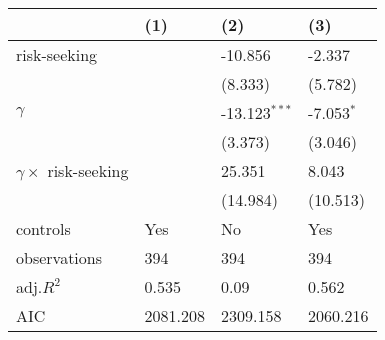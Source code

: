 \begin{tabular}{llll}
\hline
 & (1) & (2) & (3) \\
\hline
risk-seeking &  & -10.856 & -2.337 \\
 &  & (8.333) & (5.782) \\
$\gamma$ &  & -13.123$^{***}$ & -7.053$^{*}$ \\
 &  & (3.373) & (3.046) \\
$\gamma \times$ risk-seeking &  & 25.351 & 8.043 \\
 &  & (14.984) & (10.513) \\
controls & Yes & No & Yes \\
observations & 394 & 394 & 394 \\
adj.$R^2$ & 0.535 & 0.09 & 0.562 \\
AIC & 2081.208 & 2309.158 & 2060.216 \\
\hline
\end{tabular}
